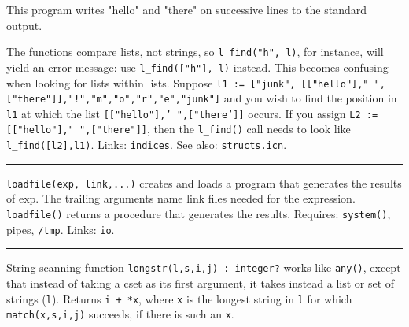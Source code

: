 
\noindent This program writes "hello" and
"there" on successive lines to the standard
output.

The functions compare lists, not strings, so
\texttt{l\_find("h", l)}, for instance,
will yield an error message: use
\texttt{l\_find(["h"], l)} instead. This
becomes confusing when looking for lists within lists. Suppose
\texttt{l1 := ["junk",
[["hello"]," ",["there"]],"!","m","o","r","e","junk"]}
and you wish to find the position in \texttt{l1} at which the list
\texttt{[["hello"],'
",["there']]} occurs. If you
assign \texttt{L2 :=
[["hello"]," ",["there"]]}, then the
\texttt{l\_find()} call needs to look like \texttt{l\_find([l2],l1)}.
Links: \texttt{indices}. See also: \texttt{structs.icn}.

\vspace{0.25cm}\hrule{}

\texttt{loadfile(exp, link,...)} creates and loads a program that
generates the results of exp. The trailing arguments name link files
needed for the expression. \texttt{loadfile()} returns a procedure that
generates the results.
Requires: \texttt{system()}, pipes, \texttt{/tmp}. Links:
\texttt{io}. 

\vspace{0.25cm}\hrule{}

String scanning function \texttt{longstr(l,s,i,j) : integer?} works like
\texttt{any()}, except that instead of taking a cset as its first
argument, it takes instead a list or set of strings (\texttt{l}).
Returns \texttt{i + *x}, where \texttt{x} is the longest string in \texttt{l} for which \texttt{match(x,s,i,j)}
succeeds, if there is such an \texttt{x}.


